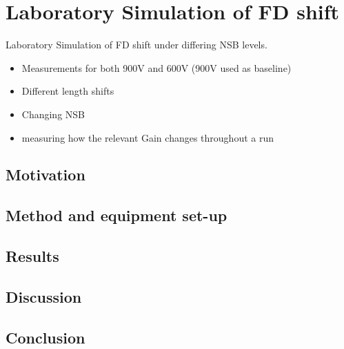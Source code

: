 \chapter[Laboratory Simulation of FD shift]{\centering Laboratory Simulation of FD shift \\}\label{Ch:LabPMTshift}

Laboratory Simulation of FD shift under differing NSB levels.
\begin{itemize}
\item Measurements for both 900V and 600V (900V used as baseline)
\item Different length shifts
\item Changing NSB
\item measuring how the relevant Gain changes throughout a run
\end{itemize}

\section{Motivation}

\section{Method and equipment set-up}

\section{Results}

\section{Discussion}

\section{Conclusion}